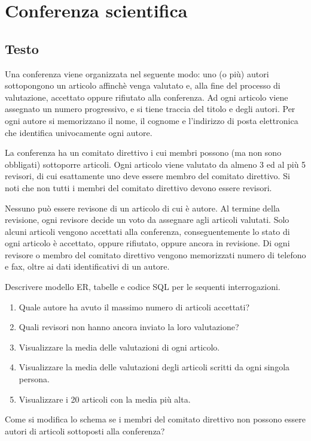 \documentclass[11pt]{article}
\begin{document}
\section{Conferenza scientifica}

\subsection{Testo}

Una conferenza viene organizzata nel seguente modo: uno (o pi\`u) autori sottopongono un
articolo affinch\`e venga valutato e, alla fine del processo di valutazione,
accettato oppure rifiutato alla conferenza. Ad ogni
articolo viene assegnato un numero progressivo, e si tiene traccia del titolo e degli
autori. Per ogni autore si memorizzano il nome, il cognome e l'indirizzo di posta
elettronica che identifica univocamente ogni autore.

La conferenza ha un comitato direttivo i cui membri possono (ma non sono obbligati)
sottoporre articoli. Ogni articolo viene valutato da almeno 3 ed al pi\`u 5 revisori, di cui
esattamente uno deve essere membro del comitato direttivo. Si noti che non tutti
i membri del comitato direttivo devono essere revisori.

Nessuno pu\`o essere revisone di un articolo di cui \`e autore. Al termine della revisione,
ogni revisore decide un voto da assegnare agli articoli valutati. Solo alcuni articoli
vengono accettati alla conferenza, conseguentemente lo stato di ogni articolo \`e
accettato, oppure rifiutato, oppure ancora in revisione. Di ogni revisore o
membro del comitato direttivo
vengono memorizzati numero di telefono e fax, oltre ai dati identificativi di un autore.

Descrivere modello ER, tabelle e codice SQL per le sequenti interrogazioni.
\begin{enumerate}
\item
Quale autore ha avuto il massimo numero di articoli accettati?
\item
Quali revisori non hanno ancora inviato la loro valutazione?
\item
Visualizzare la media delle valutazioni di ogni articolo.
\item
Visualizzare la media delle valutazioni degli articoli scritti da ogni singola persona.
\item
Visualizzare i 20 articoli con la media pi\`u alta.
\end{enumerate}
Come si modifica lo schema se i membri del comitato direttivo non possono essere
autori di articoli sottoposti alla conferenza?
\end{document}
